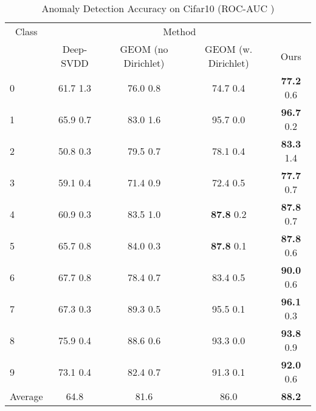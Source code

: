 \documentclass{article} \usepackage{iclr2020_conference,times}
\begin{document}
\begin{table}[t]
  \centering
      
  \caption{Anomaly Detection Accuracy on Cifar10 (ROC-AUC )}
  \label{tab:exp_small}

    \begin{tabular}{lcccc}
    \toprule      

    \multicolumn{1}{c}{Class} & \multicolumn{4}{c}{Method} \\
   & Deep-SVDD & GEOM (no Dirichlet) &GEOM (w. Dirichlet) & Ours \\
    \midrule
   0 & 61.7  1.3 & 76.0  0.8 & 74.7  0.4 & \textbf{77.2}  0.6\\
   1 & 65.9  0.7 & 83.0  1.6 & 95.7  0.0 & \textbf{96.7}  0.2\\
   2 & 50.8  0.3 & 79.5  0.7 & 78.1  0.4 & \textbf{83.3}  1.4\\
   3 & 59.1  0.4 & 71.4  0.9 & 72.4  0.5 & \textbf{77.7}  0.7\\
   4 & 60.9  0.3 & 83.5  1.0 & \textbf{87.8}  0.2 & \textbf{87.8}  0.7\\
   5 & 65.7  0.8 & 84.0  0.3 & \textbf{87.8}  0.1 & \textbf{87.8}  0.6\\
   6 & 67.7  0.8 & 78.4  0.7 & 83.4  0.5 & \textbf{90.0}  0.6\\
   7 & 67.3  0.3 & 89.3  0.5 & 95.5  0.1 & \textbf{96.1}  0.3\\
   8 & 75.9  0.4 & 88.6  0.6 & 93.3  0.0 & \textbf{93.8}  0.9\\
   9 & 73.1  0.4 & 82.4  0.7 & 91.3  0.1 & \textbf{92.0}  0.6\\
   \midrule
   Average & 64.8 & 81.6 & 86.0 & \textbf{88.2} \\
	 \bottomrule
    \end{tabular}

\end{table}
\end{document}
